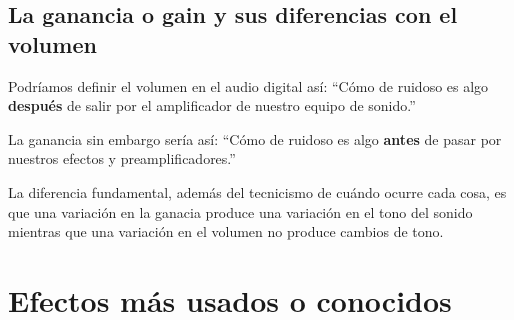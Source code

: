 \subsection{La ganancia o gain y sus diferencias con el volumen}\label{sec:Gain}

Podríamos definir el volumen en el audio digital así: ``Cómo de ruidoso es algo \textbf{después} de salir por el amplificador de nuestro equipo de sonido.'' 

La ganancia sin embargo sería así: ``Cómo de ruidoso es algo \textbf{antes} de pasar por nuestros efectos y preamplificadores.''

La diferencia fundamental, además del tecnicismo de cuándo ocurre cada cosa, es que una variación en la ganacia produce una variación en el tono del sonido mientras que una variación en el volumen no produce cambios de tono.

\section{Efectos más usados o conocidos}



